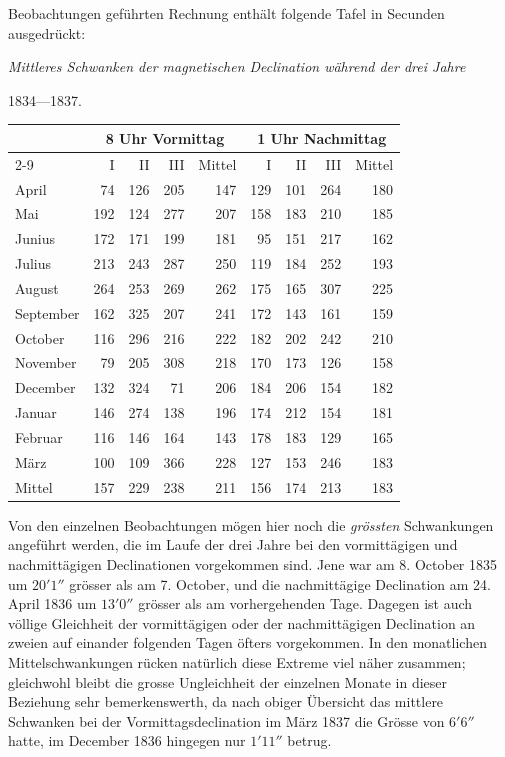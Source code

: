 Beobachtungen geführten Rechnung enthält folgende Tafel in Secunden ausgedrückt:
\begin{center}\small
\textit{Mittleres Schwanken der magnetischen Declination während der drei Jahre}\par
1834---1837.\par\smallskip
\begin{tabular}{l|r|r|r||r||r|r|r||r}
&\multicolumn{4}{c||}{8 Uhr Vormittag}&\multicolumn{4}{c}{1 Uhr Nachmittag}\\\cline{2-9}
&I&II&III&Mittel&I&II&III&Mittel\\\hline
April&74&126&205&147&129&101&264&180\\
Mai&192&124&277&207&158&183&210&185\\
Junius&172&171&199&181&95&151&217&162\\
Julius&213&243&287&250&119&184&252&193\\
August&264&253&269&262&175&165&307&225\\
September&162&325&207&241&172&143&161&159\\
October&116&296&216&222&182&202&242&210\\
November&79&205&308&218&170&173&126&158\\
December&132&324&71&206&184&206&154&182\\
Januar&146&274&138&196&174&212&154&181\\
Februar&116&146&164&143&178&183&129&165\\
März&100&109&366&228&127&153&246&183\\\hline
Mittel&157&229&238&211&156&174&213&183
\end{tabular}
\end{center}

Von den einzelnen Beobachtungen mögen hier noch die \textit{grössten} Schwan\-kungen angeführt werden, die im Laufe der drei Jahre bei den vormittägigen und nachmittägigen Declinationen vorgekommen sind. Jene war am 8. October 1835 um $20'1''$ grösser als am 7. October, und die nachmittägige Declination am 24. April 1836 um $13'0''$ grösser als am vorhergehenden Tage. Dagegen ist auch völlige Gleichheit der vormittägigen oder der nachmittägigen Declination an zweien auf einander folgenden Tagen öfters vorgekommen. In den monatlichen Mittelschwankungen rücken natürlich diese Extreme viel näher zusammen; gleichwohl bleibt die grosse Ungleichheit der einzelnen Monate in dieser Beziehung sehr bemerkenswerth, da nach obiger Übersicht das mittlere Schwanken bei der Vormittagsdeclination im März 1837 die Grösse von $6'6''$ hatte, im December 1836 hingegen nur $1'11''$ betrug.

